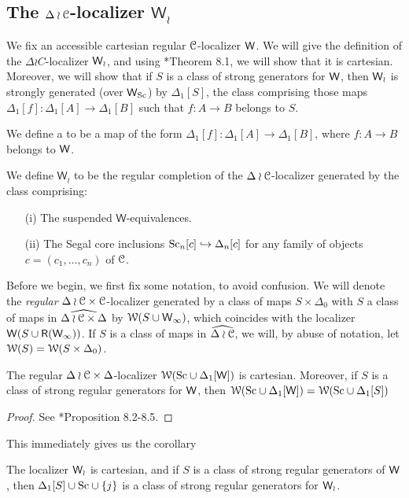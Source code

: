 \subsection{The $\Delta\wr \mathcal{C}$-localizer $\mathsf{W}_{\wr}$}\label{weakenrichment}
We fix an accessible cartesian regular \(\mathcal{C}\)-localizer \(\mathsf{W}\).  We will give the definition of the \(\Delta\wr C\)-localizer \(\mathsf{W}_\wr\), and using \cite{rezk-theta-n-spaces}*{Theorem 8.1}, we will show that it is cartesian.  Moreover, we will show that if \(S\) is a class of strong generators for \(\mathsf{W}\), then \(\mathsf{W}_{\wr}\) is strongly generated (over \(\mathsf{W}_{\operatorname{Sc}}\)) by \(\Delta_1[S]\), the class comprising those maps \(\Delta_1[f]:\Delta_1[A]\to \Delta_1[B]\) such that \(f:A\to B\) belongs to \(S\).    
\begin{defn}We define a  to be a map of the form \(\Delta_1[f]:\Delta_1[A]\to \Delta_1[B]\), where \(f:A\to B\) belongs to \(\mathsf{W}\).  
\end{defn}
\begin{defn} We define \(\mathsf{W}_\wr\) to be the regular completion of the \(\Delta\wr\mathcal{C}\)-localizer generated by the class comprising:
\begin{enumerate}
\item [(i)] The suspended \(\mathsf{W}\)-equivalences.
\item [(ii)] The Segal core inclusions \({\operatorname{Sc}}_n[c]\hookrightarrow \Delta_n[c]\) for any family of objects \(c=(c_1,\dots,c_n)\) of \(\mathcal{C}\).
\end{enumerate}     
\end{defn}
Before we begin, we first fix some notation, to avoid confusion.  We will denote the \emph{regular} \(\Delta\wr \mathcal{C}\times \mathcal{C}\)-localizer generated by a class of maps \(S\times \Delta_0\) with \(S\) a class of maps in \(\widehat{\Delta\wr \mathcal{C}\times \Delta}\) by \(\mathcal{W}(S\cup \mathsf{W}_\infty)\), which coincides with the localizer \(\mathsf{W}(S\cup \mathsf{R}(\mathsf{W}_\infty))\).  If \(S\) is a class of maps in \(\widehat{\Delta\wr \mathcal{C}}\), we will, by abuse of notation, let \(\mathcal{W}(S)=\mathcal{W}(S\times \Delta_0)\).  
\begin{thm} The regular \(\Delta\wr \mathcal{C}\times \Delta\)-localizer \(\mathcal{W}({\operatorname{Sc}}\cup \Delta_1[\mathsf{W}])\) is cartesian.  Moreover, if \(S\) is a class of strong regular generators for \(\mathsf{W}\), then \(\mathcal{W}({\operatorname{Sc}}\cup \Delta_1[\mathsf{W}])=\mathcal{W}({\operatorname{Sc}}\cup \Delta_1[S])\)
\end{thm}
\begin{proof}See \cite{rezk-theta-n-spaces}*{Proposition 8.2-8.5}.
\end{proof}
This immediately gives us the corollary
\begin{cor}The localizer \(\mathsf{W}_\wr\) is cartesian, and if \(S\) is a class of strong regular generators of \(\mathsf{W}\), then \(\Delta_1[S]\cup {\operatorname{Sc}} \cup \{j\}\) is a class of strong regular generators for \(\mathsf{W}_\wr\).   
\end{cor}





